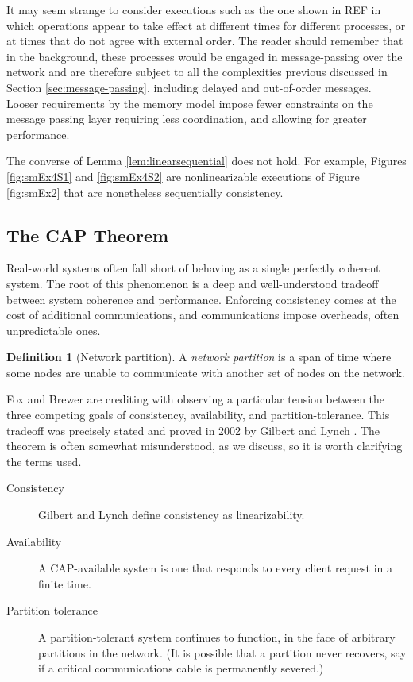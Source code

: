 \documentclass[]             %
{NASA}                       %
\theoremstyle{definition}
\newtheorem{definition}{Definition}[section]
\begin{document}
It may seem strange to consider executions such as the one shown in
REF in which operations appear to take effect at different times for
different processes, or at times that do not agree with external
order. The reader should remember that in the background, these
processes would be engaged in message-passing over the network and are
therefore subject to all the complexities previous discussed in
Section \ref{sec:message-passing}, including delayed and out-of-order
messages. Looser requirements by the memory model impose fewer
constraints on the message passing layer requiring less coordination,
and allowing for greater performance.

The converse of Lemma \ref{lem:linearsequential} does not hold. For
example, Figures \ref{fig:smEx4S1} and \ref{fig:smEx4S2} are
nonlinearizable executions of Figure \ref{fig:smEx2} that are
nonetheless sequentially consistency.

\subsection{The CAP Theorem}
Real-world systems often fall short of behaving as a single perfectly
coherent system. The root of this phenomenon is a deep and
well-understood tradeoff between system coherence and performance.
Enforcing consistency comes at the cost of additional communications,
and communications impose overheads, often unpredictable ones.

\begin{definition}[Network partition]
  A \emph{network partition} is a span of time where some nodes are
  unable to communicate with another set of nodes on the network.
\end{definition}

Fox and Brewer \cite{1999foxbrewer} are crediting with observing a
particular tension between the three competing goals of consistency,
availability, and partition-tolerance. This tradeoff was precisely
stated and proved in 2002 by Gilbert and Lynch
\cite{2002gilbertlynchCAP}.  The theorem is often somewhat
misunderstood, as we discuss, so it is worth clarifying the terms
used.

\begin{description}
\item[Consistency] Gilbert and Lynch define consistency as linearizability.
\item[Availability] A CAP-available system is one that responds to
  every client request in a finite time.
\item[Partition tolerance] A partition-tolerant system continues to
  function, in the face of arbitrary partitions in the network. (It is
  possible that a partition never recovers, say if a critical
  communications cable is permanently severed.)
\end{description}
\end{document}
